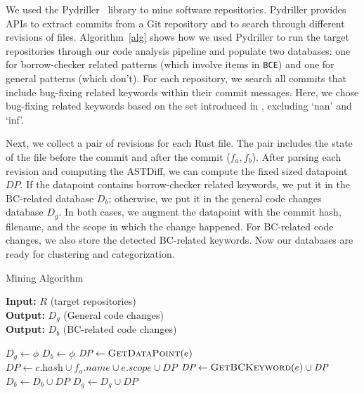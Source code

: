 We used the Pydriller~\citep{spadini2018pydriller} library to mine software repositories. Pydriller provides APIs to extract commits from a Git repository and to search through different revisions of files. Algorithm~\ref{alg} shows how we used Pydriller to run the target repositories through our code analysis pipeline and populate two databases: one for borrow-checker related patterns (which involve items in \texttt{BCE}) and one for general patterns (which don't). For each repository, we search all commits that include bug-fixing related keywords within their commit messages. Here, we chose bug-fixing related keywords based on the set introduced in \cite{zhang2018empirical}, excluding `nan' and `inf'. 


Next, we collect a pair of revisions for each Rust file. The pair includes the state of the file before the commit and after the commit ($f_a, f_b$). After parsing each revision and computing the ASTDiff, we can compute the fixed sized datapoint $\mathit{DP}$. If the datapoint contains borrow-checker related keywords, we put it in the BC-related database $D_b$; otherwise, we put it in the general code changes database $D_g$. In both cases, we augment the datapoint with the commit hash, filename, and the scope in which the change happened. For BC-related code changes, we also store the detected BC-related keywords. Now our databases are ready for clustering and categorization.

\begin{algorithm}
\caption{\label{alg} Mining Algorithm}
\hspace*{2mm} \textbf{Input:} $R$ (target repositories)  \\
\hspace*{2mm} \textbf{Output:} $D_g$ (General code changes) \\
\hspace*{2mm} \textbf{Output:} $D_b$ (BC-related code changes)
\begin{algorithmic}
\State $D_g \leftarrow \phi$
\State $D_b \leftarrow \phi$
                    \State $\textit{DP} \leftarrow \textsc{GetDataPoint}(e)$
                    \State $\textit{DP} \leftarrow c.\textit{hash} \cup f_a.\textit{name} \cup e.\textit{scope} \cup \textit{DP} $
                        \State $\textit{DP} \leftarrow \textsc{GetBCKeyword}(e) \cup \textit{DP} $
                        \State $D_b \leftarrow D_b \cup \textit{DP}$
                    \Else
                        \State $D_g \leftarrow D_g \cup \textit{DP}$
                    \EndIf
                \EndFor
            \EndFor
        \EndIf
    \EndFor
\EndFor
\end{algorithmic}
\end{algorithm}

